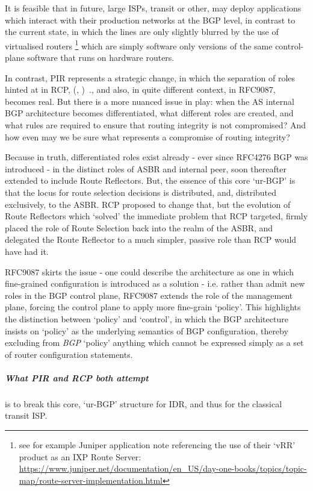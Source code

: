 It is feasible that in future, large ISPs, transit or other, may deploy applications which interact with their production networks at the BGP level, in contrast to the current state, in which the lines are only slightly blurred by the use of virtualised routers \footnote{see for example Juniper application note referencing the use of their `vRR' product as an IXP Route Server: \url{https://www.juniper.net/documentation/en_US/day-one-books/topics/topic-map/route-server-implementation.html}} which are simply software only versions of the same control-plane software that runs on hardware routers.

In contrast, PIR represents a strategic change, in which the separation of roles hinted at in RCP, (\citeauthor{Feamster2004}, \citeyear{Feamster2004})~\cite{Feamster2004}., and also, in quite different context, in RFC9087, becomes real.  But there is a more nuanced issue in play: when the AS internal BGP architecture becomes differentiated, what different roles are created, and what rules are required to ensure that routing integrity is not compromised? And how even may we be sure what represents a compromise of routing integrity?

Because in truth, differentiated roles exist already - ever since RFC4276 BGP was introduced - in the distinct roles of ASBR and internal peer, soon thereafter extended to include Route Reflectors.  But, the essence of this core `ur-BGP' is that the locus for route selection decisions is distributed, and, distributed exclusively, to the ASBR.  RCP proposed to change that, but the evolution of Route Reflectors which `solved' the immediate problem that RCP targeted, firmly placed the role of Route Selection back into the realm of the ASBR, and delegated the Route Reflector to a much simpler, passive role than RCP would have had it.

RFC9087 skirts the issue - one could describe the architecture as one in which fine-grained configuration is introduced as a solution - i.e. rather than admit new roles in the BGP control plane, RFC9087 extends the role of the management plane, forcing the control plane to apply more fine-grain `policy'.  This highlights the distinction between `policy' and `control', in which the BGP architecture insists on `policy' as the underlying semantics of BGP configuration, thereby excluding from \textit{BGP} `policy' anything which cannot be expressed simply as a set of router configuration statements.

\subparagraph{What PIR and RCP both attempt}
 is to break this core, `ur-BGP' structure for IDR, and thus for the classical transit ISP.
 
